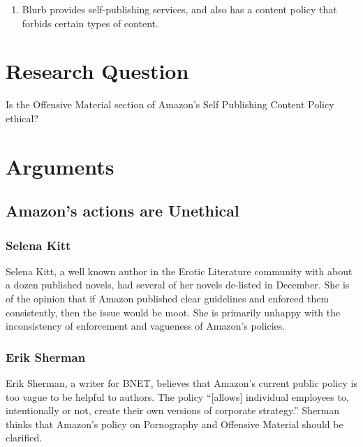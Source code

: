 \documentclass[11pt]{article}
\begin{document}
\begin{multicols}{2}
\begin{itemize}
\begin{enumerate}
   \item Blurb provides self-publishing services, and also has a content policy that forbids certain types of content. \cite{BlurbEULA}
   \end{enumerate}

\end{itemize}

\section{Research Question}

Is the Offensive Material section of Amazon's Self Publishing Content Policy ethical?


\section{Arguments}

\subsection{Amazon's actions are Unethical}

\subsubsection{Selena Kitt}
Selena Kitt, a well known author in the Erotic Literature community with about a dozen published novels, had several of her novels de-listed in December.  She is of the opinion that if Amazon published clear guidelines and enforced them consistently, then the issue would be moot.  She is primarily unhappy with the inconsistency of enforcement and vagueness of Amazon's policies. \cite{KittSelfPubRevolution}

\subsubsection{Erik Sherman}
Erik Sherman, a writer for BNET, believes that Amazon's current public policy is too vague to be helpful to authors.  The policy  ``[allows] individual employees to, intentionally or not, create their own versions of corporate strategy.'' \cite{ShermanAmazonExecs} Sherman thinks that Amazon's policy on Pornography and Offensive Material should be clarified.


\end{multicols}
\end{document}
